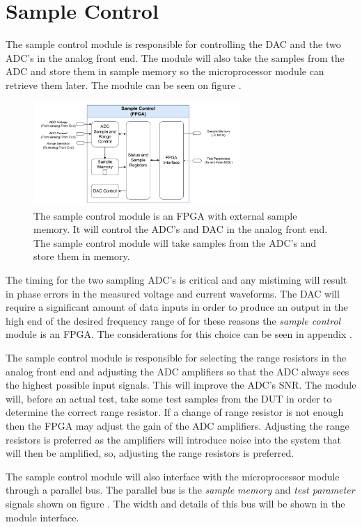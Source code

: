 \section{Sample Control} \label{sec:Sample Control}
The sample control module is responsible for controlling the DAC and the two ADC's in the analog front end. The module will also take the samples from the ADC and store them in sample memory so the microprocessor module can retrieve them later. The module can be seen on figure .

\begin{figure}[H]
    \centering
    \includegraphics[clip, trim=18 0 18 0,width=0.70\textwidth]{Sections/6_SystemArchitecture/Figures/FPGA.pdf}
    \caption{The sample control module is an FPGA with external sample memory. It will control the ADC's and DAC in the analog front end. The sample control module will take samples from the ADC's and store them in memory.}
    \label{fig_6_3_SampleControl}
\end{figure}

The timing for the two sampling ADC's is critical and any mistiming will result in phase errors in the measured voltage and current waveforms. The DAC will require a significant amount of data inputs in order to produce an output in the high end of the desired frequency range of  for these reasons the \textit{sample control} module is an FPGA. The considerations for this choice can be seen in appendix . 

The sample control module is responsible for selecting the range resistors in the analog front end and adjusting the ADC amplifiers so that the ADC always sees the highest possible input signals. This will improve the ADC's SNR. The module will, before an actual test, take some test samples from the DUT in order to determine the correct range resistor. If a change of range resistor is not enough then the FPGA may adjust the gain of the ADC amplifiers. Adjusting the range resistors is preferred as the amplifiers will introduce noise into the system that will then be amplified, so, adjusting the range resistors is preferred.

The sample control module will also interface with the microprocessor module through a parallel bus. The parallel bus is the \textit{sample memory} and \textit{test parameter} signals shown on figure . The width and details of this bus will be shown in the module interface. 